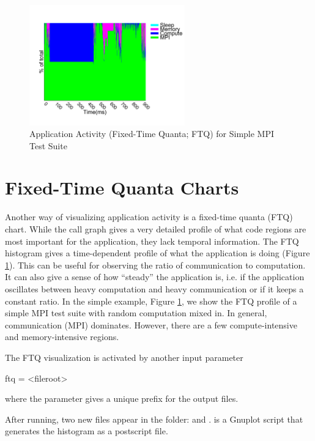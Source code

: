 

\begin{figure}[h!]
\centering
\includegraphics[width=0.6\textwidth]{figures/gnuplot/ftq/ftq.pdf}
\caption{Application Activity (Fixed-Time Quanta; FTQ) for Simple MPI Test Suite}
\label{fig:ftq}
\end{figure}
\section{Fixed-Time Quanta Charts}
\label{sec:tutorials:ftq}
Another way of visualizing application activity is a fixed-time quanta (FTQ) chart.
While the call graph gives a very detailed profile of what code regions are most important for the application, they lack temporal information.
The FTQ histogram gives a time-dependent profile of what the application is doing (Figure \ref{fig:ftq}).
This can be useful for observing the ratio of communication to computation.
It can also give a sense of how ``steady'' the application is, 
i.e. if the application oscillates between heavy computation and heavy communication or if it keeps a constant ratio.
In the simple example, Figure \ref{fig:ftq}, we show the FTQ profile of a simple MPI test suite with random computation mixed in.
In general, communication (MPI) dominates.  However, there are a few compute-intensive and memory-intensive regions.

The FTQ visualization is activated by another input parameter

\begin{ViFile}
ftq = <fileroot>
\end{ViFile}

where the  parameter gives a unique prefix for the output files. 

After running, two new files appear in the folder:  and .
 is a Gnuplot script that generates the histogram as a postscript file.

